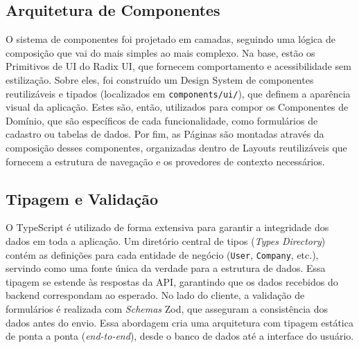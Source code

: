 \subsection{Arquitetura de Componentes}

O sistema de componentes foi projetado em camadas, seguindo uma lógica de composição que vai do mais simples ao mais complexo. Na base, estão os Primitivos de UI do Radix UI, que fornecem comportamento e acessibilidade sem estilização. Sobre eles, foi construído um Design System de componentes reutilizáveis e tipados (localizados em \texttt{components/ui/}), que definem a aparência visual da aplicação. Estes são, então, utilizados para compor os Componentes de Domínio, que são específicos de cada funcionalidade, como formulários de cadastro ou tabelas de dados. Por fim, as Páginas são montadas através da composição desses componentes, organizadas dentro de Layouts reutilizáveis que fornecem a estrutura de navegação e os provedores de contexto necessários.


\subsection{Tipagem e Validação}

O TypeScript é utilizado de forma extensiva para garantir a integridade dos dados em toda a aplicação. Um diretório central de tipos (\textit{Types Directory}) contém as definições para cada entidade de negócio (\texttt{User}, \texttt{Company}, etc.), servindo como uma fonte única da verdade para a estrutura de dados. Essa tipagem se estende às respostas da API, garantindo que os dados recebidos do backend correspondam ao esperado. No lado do cliente, a validação de formulários é realizada com \textit{Schemas} Zod, que asseguram a consistência dos dados antes do envio. Essa abordagem cria uma arquitetura com tipagem estática de ponta a ponta (\textit{end-to-end}), desde o banco de dados até a interface do usuário.


